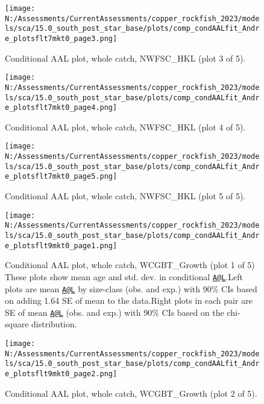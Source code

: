 \documentclass[11pt,
  english,
  letterpaper,
]{article}
\begin{document}
\begin{figure}
\centering
\texttt{[image: N:/Assessments/CurrentAssessments/copper\_rockfish\_2023/models/sca/15.0\_south\_post\_star\_base/plots/comp\_condAALfit\_Andre\_plotsflt7mkt0\_page3.png]}
\caption{Conditional AAL plot, whole catch, NWFSC\_HKL (plot 3 of 5).\label{fig:comp_condAALfit_Andre_plotsflt7mkt0_page3}}
\end{figure}

\begin{figure}
\centering
\texttt{[image: N:/Assessments/CurrentAssessments/copper\_rockfish\_2023/models/sca/15.0\_south\_post\_star\_base/plots/comp\_condAALfit\_Andre\_plotsflt7mkt0\_page4.png]}
\caption{Conditional AAL plot, whole catch, NWFSC\_HKL (plot 4 of 5).\label{fig:comp_condAALfit_Andre_plotsflt7mkt0_page4}}
\end{figure}

\begin{figure}
\centering
\texttt{[image: N:/Assessments/CurrentAssessments/copper\_rockfish\_2023/models/sca/15.0\_south\_post\_star\_base/plots/comp\_condAALfit\_Andre\_plotsflt7mkt0\_page5.png]}
\caption{Conditional AAL plot, whole catch, NWFSC\_HKL (plot 5 of 5).\label{fig:comp_condAALfit_Andre_plotsflt7mkt0_page5}}
\end{figure}

\begin{figure}
\centering
\texttt{[image: N:/Assessments/CurrentAssessments/copper\_rockfish\_2023/models/sca/15.0\_south\_post\_star\_base/plots/comp\_condAALfit\_Andre\_plotsflt9mkt0\_page1.png]}
\caption{Conditional AAL plot, whole catch, WCGBT\_Growth (plot 1 of 5) These plots show mean age and std. dev. in conditional \href{mailto:A@L}{\nolinkurl{A@L}}.Left plots are mean \href{mailto:A@L}{\nolinkurl{A@L}} by size-class (obs. and exp.) with 90\% CIs based on adding 1.64 SE of mean to the data.Right plots in each pair are SE of mean \href{mailto:A@L}{\nolinkurl{A@L}} (obs. and exp.) with 90\% CIs based on the chi-square distribution.\label{fig:comp_condAALfit_Andre_plotsflt9mkt0_page1}}
\end{figure}

\begin{figure}
\centering
\texttt{[image: N:/Assessments/CurrentAssessments/copper\_rockfish\_2023/models/sca/15.0\_south\_post\_star\_base/plots/comp\_condAALfit\_Andre\_plotsflt9mkt0\_page2.png]}
\caption{Conditional AAL plot, whole catch, WCGBT\_Growth (plot 2 of 5).\label{fig:comp_condAALfit_Andre_plotsflt9mkt0_page2}}
\end{figure}
\end{document}
